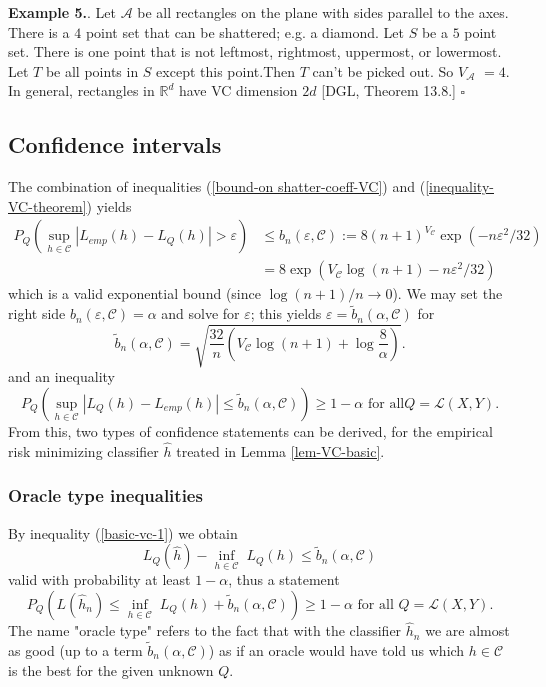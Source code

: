 \documentclass[11pt,twoside]{article}%
\theoremstyle{change}
\begin{document}
\textbf{Example 5.}. Let $\mathcal{A}$ be all rectangles on the plane with
sides parallel to the axes. There is a $4$ point set that can be shattered;
e.g. a diamond. Let $S$ be a $5$ point set. There is one point that is not
leftmost, rightmost, uppermost, or lowermost. Let $T$ be all points in $S$
except this point.Then $T$ can't be picked out. So $V_{\mathcal{A}}$ $=4$. In
general, rectangles in $\mathbb{R}^{d}$ have VC dimension $2d$ [DGL, Theorem
13.8.] $\square$\bigskip\bigskip

\subsection{Confidence intervals}

The combination of inequalities (\ref{bound-on shatter-coeff-VC}) and
(\ref{inequality-VC-theorem}) yields
\begin{align*}
P_{Q}\left(  \sup_{h\in\mathcal{C}}\left\vert L_{emp}(h)-L_{Q}(h)\right\vert
>\varepsilon\right)   & \leq b_{n}(\varepsilon,\mathcal{C}):=8\left(
n+1\right)  ^{V_{\mathcal{C}}}\exp\left(  -n\varepsilon^{2}/32\right) \\
& =8\exp\left(  V_{\mathcal{C}}\log(n+1)-n\varepsilon^{2}/32\right)
\end{align*}
which is a valid exponential bound (since $\log(n+1)/n\rightarrow0$). We may
set the right side $b_{n}(\varepsilon,\mathcal{C})=\alpha$ and solve for
$\varepsilon$; this yields $\varepsilon=\tilde{b}_{n}(\alpha,\mathcal{C})$
for
\[
\tilde{b}_{n}(\alpha,\mathcal{C})=\sqrt{\frac{32}{n}\left(  V_{\mathcal{C}%
}\log(n+1)+\log\frac{8}{\alpha}\right)  }.
\]
and an inequality
\begin{equation}
P_{Q}\left(  \sup_{h\in\mathcal{C}}\left\vert L_{Q}(h)-L_{emp}(h)\right\vert
\leq\tilde{b}_{n}(\alpha,\mathcal{C})\right)  \geq1-\alpha\text{ for all
}Q=\mathcal{L}\left(  X,Y\right)  \text{.}\label{inequ-basic-VC-uniform}%
\end{equation}
From this, two types of confidence statements can be derived, for the
empirical risk minimizing classifier $\hat{h}$ treated in Lemma
\ref{lem-VC-basic}.

\bigskip

\subsubsection{Oracle type inequalities}

By inequality (\ref{basic-vc-1}) we obtain
\[
L_{Q}(\hat{h})-\inf_{h\in\mathcal{C}}\;L_{Q}(h)\leq\tilde{b}_{n}%
(\alpha,\mathcal{C})
\]
valid with probability at least $1-\alpha$, thus a statement
\begin{equation}
P_{Q}\left(  L(\hat{h}_{n})\leq\inf_{h\in\mathcal{C}}\;L_{Q}(h)+\tilde{b}%
_{n}(\alpha,\mathcal{C})\right)  \geq1-\alpha\text{ for all }Q=\mathcal{L}%
\left(  X,Y\right)  .\label{pac-inequa}%
\end{equation}
The name "oracle type" refers to the fact that with the classifier $\hat
{h}_{n}$ we are almost as good (up to a term $\tilde{b}_{n}(\alpha
,\mathcal{C}) $) as if an oracle would have told us which $h\in\mathcal{C}$ is
the best for the given unknown $Q$.%
\end{document}
